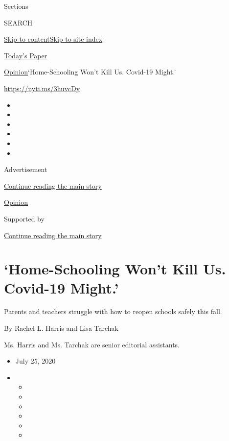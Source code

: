 Sections

SEARCH

\protect\hyperlink{site-content}{Skip to
content}\protect\hyperlink{site-index}{Skip to site index}

\href{https://myaccount.nytimes3xbfgragh.onion/auth/login?response_type=cookie\&client_id=vi}{}

\href{https://www.nytimes3xbfgragh.onion/section/todayspaper}{Today's
Paper}

\href{/section/opinion}{Opinion}\textbar{}`Home-Schooling Won't Kill Us.
Covid-19 Might.'

\url{https://nyti.ms/3huvcDy}

\begin{itemize}
\item
\item
\item
\item
\item
\item
\end{itemize}

Advertisement

\protect\hyperlink{after-top}{Continue reading the main story}

\href{/section/opinion}{Opinion}

Supported by

\protect\hyperlink{after-sponsor}{Continue reading the main story}

\hypertarget{home-schooling-wont-kill-us-covid-19-might}{%
\section{`Home-Schooling Won't Kill Us. Covid-19
Might.'}\label{home-schooling-wont-kill-us-covid-19-might}}

Parents and teachers struggle with how to reopen schools safely this
fall.

By Rachel L. Harris and Lisa Tarchak

Ms. Harris and Ms. Tarchak are senior editorial assistants.

\begin{itemize}
\item
  July 25, 2020
\item
  \begin{itemize}
  \item
  \item
  \item
  \item
  \item
  \item
  \end{itemize}
\end{itemize}

